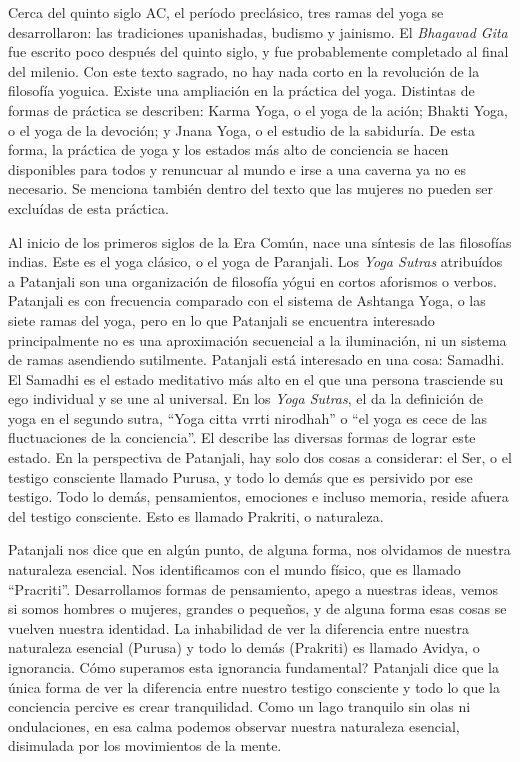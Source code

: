 Cerca del quinto siglo AC, el período preclásico, tres ramas del yoga se desarrollaron: las tradiciones upanishadas, budismo y jainismo. El \textit{Bhagavad Gita} fue escrito poco despu\'es del quinto siglo, y fue probablemente completado al final del milenio. Con este texto sagrado, no hay nada corto en la revolución de la filosofía yoguica. Existe una ampliación en la práctica del yoga. Distintas de formas de práctica se describen: Karma Yoga, o el yoga de la ación; Bhakti Yoga, o el yoga de la devoción; y Jnana Yoga, o el estudio de la sabiduría. De esta forma, la práctica de yoga y los estados más alto de conciencia se hacen disponibles para todos y renuncuar al mundo e irse a una caverna ya no es necesario. Se menciona tambi\'en dentro del texto que las mujeres no pueden ser excluídas de esta práctica.

Al inicio de los primeros siglos de la Era Común, nace una síntesis de las filosofías indias. Este es el yoga clásico, o el yoga de Paranjali. Los \textit{Yoga Sutras} atribuídos a Patanjali son una organización de filosofía yógui en cortos aforismos o verbos. Patanjali es con frecuencia comparado con el sistema de Ashtanga Yoga, o las siete ramas del yoga, pero en lo que Patanjali se encuentra interesado principalmente no es una aproximación secuencial a la iluminación, ni un sistema de ramas asendiendo sutilmente. Patanjali está interesado en una cosa: Samadhi. El Samadhi es el estado meditativo más alto en el que una persona trasciende su ego individual y se une al universal. En los \textit{Yoga Sutras}, el da la definición de yoga en el segundo sutra, ``Yoga citta vrrti nirodhah'' o ``el yoga es cece de las fluctuaciones de la conciencia''. El describe las diversas formas de lograr este estado. En la perspectiva de Patanjali, hay solo dos cosas a considerar: el Ser, o el testigo consciente llamado Purusa, y todo lo demás que es persivido por ese testigo. Todo lo demás, pensamientos, emociones e incluso memoria, reside afuera del testigo consciente. Esto es llamado Prakriti, o naturaleza.

Patanjali nos dice que en algún punto, de alguna forma, nos olvidamos de nuestra naturaleza esencial. Nos identificamos con el mundo físico, que es llamado ``Pracriti''. Desarrollamos formas de pensamiento, apego a nuestras ideas, vemos si somos hombres o mujeres, grandes o pequeños, y de alguna forma esas cosas se vuelven nuestra identidad. La inhabilidad de ver la diferencia entre nuestra naturaleza esencial (Purusa) y todo lo demás (Prakriti) es llamado Avidya, o ignorancia. Cómo superamos esta ignorancia fundamental? Patanjali dice que la única forma de ver la diferencia entre nuestro testigo consciente y todo lo que la conciencia percive es crear tranquilidad. Como un lago tranquilo sin olas ni ondulaciones, en esa calma podemos observar nuestra naturaleza esencial, disimulada por los movimientos de la mente.

